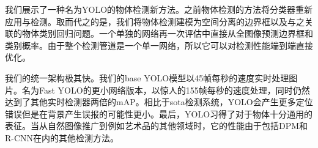 \documentclass[../main.tex]{subfile}
\begin{document}
我们展示了一种名为YOLO的物体检测新方法。之前物体检测的方法将分类器重新应用与检测。取而代之的是，我们将物体检测建模为空间分离的边界框以及与之关联的物体类别回归问题。一个单独的网络再一次评估中直接从全图像预测边界框和类别概率。由于整个检测管道是一个单一网络，所以它可以对检测性能端到端直接优化。

我们的统一架构极其快。我们的base YOLO模型以45帧每秒的速度实时处理图片。名为Fast YOLO的更小网络版本，以惊人的155帧每秒的速度处理，同时仍然达到了其他实时检测器两倍的mAP。相比于sota检测系统，YOLO会产生更多定位错误但是在背景产生误报的可能性更小。最后，YOLO习得了对于物体十分通用的表征。当从自然图像推广到例如艺术品的其他领域时，它的性能由于包括DPM和R-CNN在内的其他检测方法。
\end{document}
